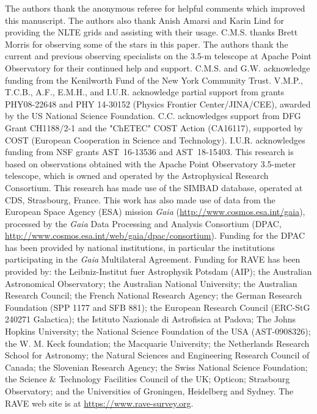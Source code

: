 \documentclass[preprint]{aastex61}
\begin{document}
\acknowledgements
The authors thank the anonymous referee for helpful comments which
improved this manuscript. The authors also thank Anish Amarsi and
Karin Lind for providing the NLTE grids and assisting with their
usage.  C.M.S. thanks Brett Morris for observing some of the stars in
this paper.  The authors thank the current and previous observing
specialists on the 3.5-m telescope at Apache Point Observatory for
their continued help and support. C.M.S. and G.W. acknowledge funding
from the Kenilworth Fund of the New York Community Trust.
V.M.P., T.C.B., A.F., E.M.H., and I.U.R. acknowledge partial support
from grants PHY08-22648 and PHY 14-30152 (Physics Frontier
Center/JINA/CEE), awarded by the US National Science Foundation.  
C.C. acknowledges support from DFG Grant CH1188/2-1 and the "ChETEC"
COST Action (CA16117), supported by COST (European Cooperation in
Science and Technology).
I.U.R. acknowledges funding from NSF grants AST~16-13536 and
AST~18-15403.
This research is based on observations obtained with the Apache Point
Observatory 3.5-meter telescope, which is owned and operated by the
Astrophysical Research Consortium.
This research has made use of the SIMBAD database, operated at CDS,
Strasbourg, France. This work has also made use of data from the
European Space Agency (ESA) mission {\it Gaia}
(\url{http://www.cosmos.esa.int/gaia}),  processed by the {\it Gaia}
Data Processing and Analysis Consortium  (DPAC,
\url{http://www.cosmos.esa.int/web/gaia/dpac/consortium}).  Funding
for the DPAC has been provided by national institutions, in particular
the institutions participating in the {\it Gaia} Multilateral
Agreement.
Funding for RAVE has been provided by: the Leibniz-Institut fuer
Astrophysik Potsdam (AIP); the Australian Astronomical Observatory;
the Australian National University; the Australian Research Council;
the French National Research Agency; the German Research Foundation
(SPP 1177 and SFB 881); the European Research Council (ERC-StG 240271
Galactica); the Istituto Nazionale di Astrofisica at Padova; The Johns
Hopkins University; the National Science Foundation of the USA
(AST-0908326); the W. M. Keck foundation; the Macquarie University;
the Netherlands Research School for Astronomy; the Natural Sciences
and Engineering Research Council of Canada; the Slovenian Research
Agency; the Swiss National Science Foundation; the Science \&
Technology Facilities Council of the UK; Opticon; Strasbourg
Observatory; and the Universities of Groningen, Heidelberg and
Sydney. 
The RAVE web site is at \url{https://www.rave-survey.org}.
\end{document}
